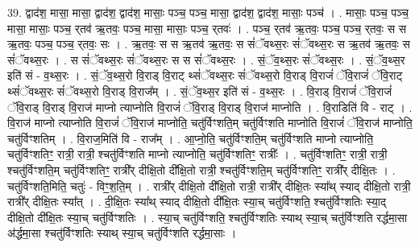 \documentclass[17pt]{extarticle}
\begin{document}
39. द्वाद॑श॒ मासा॒ मासा॒ द्वाद॑श॒ द्वाद॑श॒ मासाः॒ पञ्च॒ पञ्च॒ मासा॒ द्वाद॑श॒ द्वाद॑श॒ मासाः॒ पञ्च॑ । . मासाः॒ पञ्च॒ पञ्च॒ मासा॒ मासाः॒ पञ्च॒ र्‌तव॑ ऋ॒तवः॒ पञ्च॒ मासा॒ मासाः॒ पञ्च॒ र्‌तवः॑ । . पञ्च॒ र्‌तव॑ ऋ॒तवः॒ पञ्च॒ पञ्च॒ र्‌तवः॒ स स ऋ॒तवः॒ पञ्च॒ पञ्च॒ र्‌तवः॒ सः । . ऋ॒तवः॒ स स ऋ॒तव॑ ऋ॒तवः॒ स सं॑ॅवथ्स॒रः सं॑ॅवथ्स॒रः स ऋ॒तव॑ ऋ॒तवः॒ स सं॑ॅवथ्स॒रः । . स सं॑ॅवथ्स॒रः सं॑ॅवथ्स॒रः स स सं॑ॅवथ्स॒रः । . सं॒ॅव॒थ्स॒रः सं॑ॅवथ्स॒रः । . सं॒ॅव॒थ्स॒र इति॑ सं - व॒थ्स॒रः । . सं॒ॅव॒थ्स॒रो वि॒राड् वि॒राट् थ्सं॑ॅवथ्स॒रः सं॑ॅवथ्स॒रो वि॒राड् वि॒राजं॑ ॅवि॒राजं॑ ॅवि॒राट् 
थ्सं॑ॅवथ्स॒रः सं॑ॅवथ्स॒रो वि॒राड् वि॒राज᳚म् । . सं॒ॅव॒थ्स॒र इति॑ सं - व॒थ्स॒रः । . वि॒राड् वि॒राजं॑ ॅवि॒राजं॑ ॅवि॒राड् वि॒राड् वि॒राज॑ माप्नो त्याप्नोति वि॒राजं॑ ॅवि॒राड् वि॒राड् वि॒राज॑ माप्नोति । . वि॒राडिति॑ वि - राट् । . वि॒राज॑ माप्नो त्याप्नोति वि॒राजं॑ ॅवि॒राज॑ माप्नोति॒ चतु॑र्विꣳशति॒म् चतु॑र्विꣳशति माप्नोति वि॒राजं॑ ॅवि॒राज॑ माप्नोति॒ चतु॑र्विꣳशतिम् । . वि॒राज॒मिति॑ वि - राज᳚म् । . आ॒प्नो॒ति॒ चतु॑र्विꣳशति॒म् चतु॑र्विꣳशति माप्नो त्याप्नोति॒ चतु॑र्विꣳशतिꣳ॒॒ रात्री॒ रात्री॒ श्चतु॑र्विꣳशति माप्नो त्याप्नोति॒ चतु॑र्विꣳशतिꣳ॒॒ रात्रीः᳚ । . चतु॑र्विꣳशतिꣳ॒॒ रात्री॒ रात्री॒ श्चतु॑र्विꣳशति॒म् चतु॑र्विꣳशतिꣳ॒॒ रात्री᳚र् दीक्षि॒तो दी᳚क्षि॒तो रात्री॒ श्चतु॑र्विꣳशति॒म् चतु॑र्विꣳशतिꣳ॒॒ रात्री᳚र् दीक्षि॒तः । . चतु॑र्विꣳशति॒मिति॒ चतुः॑ - विꣳ॒॒श॒ति॒म् । . रात्री᳚र् दीक्षि॒तो दी᳚क्षि॒तो रात्री॒ रात्री᳚र् दीक्षि॒तः स्या᳚थ् स्याद् दीक्षि॒तो रात्री॒ रात्री᳚र् दीक्षि॒तः स्या᳚त् । . दी॒क्षि॒तः स्या᳚थ् स्याद् दीक्षि॒तो दी᳚क्षि॒तः स्या॒च् चतु॑र्विꣳशति॒ श्चतु॑र्विꣳशतिः स्या॒द् दीक्षि॒तो दी᳚क्षि॒तः स्या॒च् चतु॑र्विꣳशतिः । . स्या॒च् चतु॑र्विꣳशति॒ श्चतु॑र्विꣳशतिः स्याथ् स्या॒च् चतु॑र्विꣳशति रर्द्धमा॒सा अ॑र्द्धमा॒सा श्चतु॑र्विꣳशतिः स्याथ् स्या॒च् चतु॑र्विꣳशति रर्द्धमा॒साः । \newline
\end{document}
